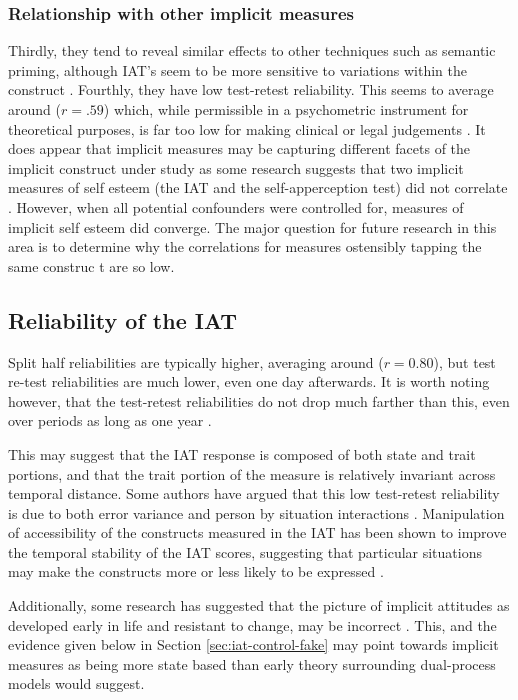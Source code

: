 \subsubsection{Relationship with other implicit measures}
\label{sec:relat-with-other}


Thirdly, they tend to reveal similar effects to other techniques such as semantic priming, although IAT's seem to be more sensitive to variations within the construct \cite{Wittenbrink2007a}. Fourthly, they have low test-retest reliability. This seems to average around ($r=.59$) which, while permissible in a psychometric instrument for theoretical purposes, is far too low for making clinical or legal judgements \cite{Greenwald2000, Blanton2006d}. It does appear that implicit measures may be capturing different facets of the implicit construct under study as some research suggests that two implicit measures of self esteem (the IAT and the self-apperception test) did not correlate \cite{Meagher2004}. However, when all potential confounders were controlled for, measures of implicit self esteem did converge. The major question for future research in this area is to determine why the correlations for measures ostensibly tapping the same construc t are so low. 

\subsection{Reliability of the IAT}
\label{sec:reliability-iat}



Split half reliabilities are typically higher, averaging around ($r=0.80$), but test re-test reliabilities are much lower, even one day afterwards. It is worth noting however, that the test-retest reliabilities do not drop much farther than this, even over periods as long as one year \cite{Egloff2005}. 

This may suggest that the IAT response is composed of both state and trait portions, and that the trait portion of the measure is relatively invariant across temporal distance. Some authors have argued that this low test-retest reliability is due to both error variance and person by situation interactions \cite{Gschwendner2008}.  Manipulation of accessibility of the constructs measured in the IAT has been shown to improve the temporal stability of the IAT scores, suggesting that particular situations may make the constructs more or less likely to be expressed \cite{Gschwendner2008}. 

Additionally, some research has suggested that the picture of implicit attitudes as developed early in life and resistant to change, may be incorrect \cite{Gschwendner2008}. This, and the evidence given below in Section \ref{sec:iat-control-fake} may point towards implicit measures as being more state based than early theory surrounding dual-process models would suggest. 

